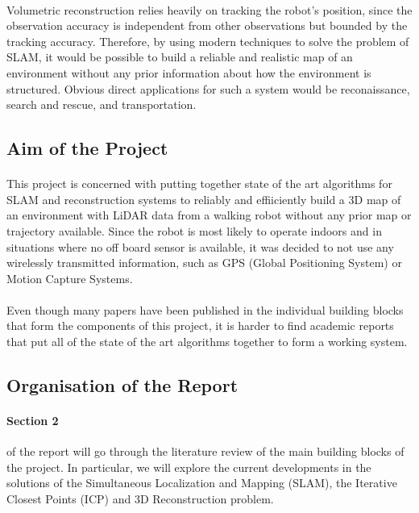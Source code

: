 \documentclass[11pt]{article}
\begin{document}
	\paragraph{}
	Volumetric reconstruction relies heavily on tracking the robot's position, since the observation accuracy is independent from other observations but bounded by the tracking accuracy. Therefore, by using modern techniques to solve the problem of SLAM, it would be possible to build a reliable and realistic map of an environment without any prior information about how the environment is structured. Obvious direct applications for such a system would be reconaissance, search and rescue, and transportation.
	
	\subsection{Aim of the Project}
	\paragraph{}
	This project is concerned with putting together state of the art algorithms for SLAM and reconstruction systems to reliably and effiiciently build a 3D map of an environment with LiDAR data from a walking robot without any prior map or trajectory available. Since the robot is most likely to operate indoors and in situations where no off board sensor is available, it was decided to not use any wirelessly transmitted information, such as GPS (Global Positioning System) or Motion Capture Systems.
	
	\paragraph{}
	Even though many papers have been published in the individual building blocks that form the components of this project, it is harder to find academic reports that put all of the state of the art algorithms together to form a working system.
	
	\subsection{ Organisation of the Report}
		\paragraph{Section 2} of the report will go through the literature review of the main building blocks of the project. In particular, we will explore the current developments in the solutions of the Simultaneous Localization and Mapping (SLAM), the Iterative Closest Points (ICP) and 3D Reconstruction problem.
		
\end{document}
